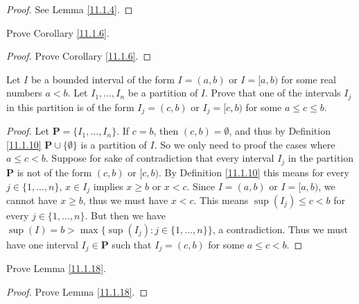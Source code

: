 \begin{proof}
    See Lemma \ref{11.1.4}.
\end{proof}

\begin{exercise}\label{ex 11.1.2}
    Prove Corollary \ref{11.1.6}.
\end{exercise}

\begin{proof}
    Prove Corollary \ref{11.1.6}.
\end{proof}

\begin{exercise}\label{ex 11.1.3}
    Let \(I\) be a bounded interval of the form \(I = (a, b)\) or \(I = [a, b)\) for some real numbers \(a < b\).
    Let \(I_1, \dots, I_n\) be a partition of \(I\).
    Prove that one of the intervals \(I_j\) in this partition is of the form \(I_j = (c, b)\) or \(I_j = [c, b)\) for some \(a \leq c \leq b\).
\end{exercise}

\begin{proof}
    Let \(\mathbf{P} = \{I_1, \dots, I_n\}\).
    If \(c = b\), then \((c, b) = \emptyset\), and thus by Definition \ref{11.1.10} \(\mathbf{P} \cup \{\emptyset\}\) is a partition of \(I\).
    So we only need to proof the cases where \(a \leq c < b\).
    Suppose for sake of contradiction that every interval \(I_j\) in the partition \(\mathbf{P}\) is not of the form \((c, b)\) or \([c, b)\).
    By Definition \ref{11.1.10} this means for every \(j \in \{1, \dots, n\}\), \(x \in I_j\) implies \(x \geq b\) or \(x < c\).
    Since \(I = (a, b)\) or \(I = [a, b)\), we cannot have \(x \geq b\), thus we must have \(x < c\).
    This means \(\sup(I_j) \leq c < b\) for every \(j \in \{1, \dots, n\}\).
    But then we have \(\sup(I) = b > \max\big\{\sup(I_j) : j \in \{1, \dots, n\}\big\}\), a contradiction.
    Thus we must have one interval \(I_j \in \mathbf{P}\) such that \(I_j = (c, b)\) for some \(a \leq c < b\).
\end{proof}

\begin{exercise}\label{ex 11.1.4}
    Prove Lemma \ref{11.1.18}.
\end{exercise}

\begin{proof}
    Prove Lemma \ref{11.1.18}.
\end{proof}